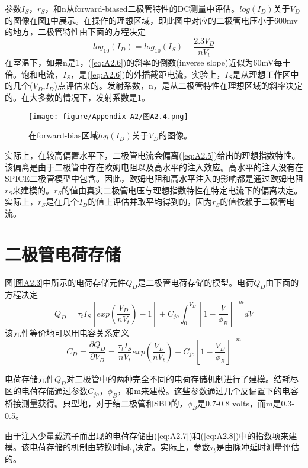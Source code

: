 参数$I_S$，$r_S$，和n从forward-biased二极管特性的DC测量中评估。$log(I_D)$关于$V_D$的图像在图\ref{图A2.4}中展示。在操作的理想区域，即此图中对应的二极管电压小于600mv的地方，二极管特性由下面的方程决定
\begin{equation}
    log_{10}(I_D) = log_{10}(I_S) + \frac{2.3V_D}{nV_t}
    \label{eq:A2.6}
\end{equation}
在室温下，如果n是1，(\ref{eq:A2.6})的斜率的倒数(inverse slope)近似为60mV每十倍。饱和电流，$I_S$，是(\ref{eq:A2.6})的外插截距电流。实验上，$I_S$是从理想工作区中的几个($V_D$,$I_D$)点评估来的。发射系数，n，是从二极管特性在理想区域的斜率决定的。在大多数的情况下，发射系数是1。

\begin{figure}[htbp]
\small
    \centering
    \texttt{[image: figure/Appendix-A2/图A2.4.png]}
    \caption{在forward-bias区域$log(I_D)$关于$V_D$的图像。}
    \label{图A2.4}
\end{figure}

实际上，在较高偏置水平下，二极管电流会偏离(\ref{eq:A2.5})给出的理想指数特性。该偏离是由于二极管中存在欧姆电阻以及高水平的注入效应\cite{ref-77}。高水平的注入没有在SPICE二极管模型中包含。因此，欧姆电阻和高水平注入的影响都是通过欧姆电阻$r_S$来建模的。$r_S$的值由真实二极管电压与理想指数特性在特定电流下的偏离决定。实际上，$r_S$是在几个$I_D$的值上评估并取平均得到的，因为$r_S$的值依赖于二极管电流。

\section{二极管电荷存储}
图\ref{图A2.3}中所示的电荷存储元件$Q_D$是二极管电荷存储的模型。电荷$Q_D$由下面的方程决定
\begin{equation}
    Q_D = \tau_t I_S[exp(\frac{V_D}{nV_t})-1] + C_{jo}\int^{V_D}_{0}[1-\frac{V}{\phi_B}]^{-m}dV
    \label{eq:A2.7}
\end{equation}
该元件等价地可以用电容关系定义
\begin{equation}
    C_D = \frac{\partial Q_D}{\partial V_D} = \frac{\tau_t I_S}{nV_t}exp(\frac{V_D}{nV_t}) + C_{jo}[1-\frac{V_D}{\phi_B}]^{-m}
    \label{eq:A2.8}
\end{equation}

电荷存储元件$Q_D$对二极管中的两种完全不同的电荷存储机制进行了建模。结耗尽区的电荷存储通过参数$C_{jo}$，$\phi_B$，和m来建模。这些参数通过几个反偏置下的电容桥接测量获得。典型地，对于结二极管和SBD的，$\phi_B$是0.7-0.8 volts，而m是0.3-0.5。 

由于注入少量载流子而出现的电荷存储由(\ref{eq:A2.7})和(\ref{eq:A2.8})中的指数项来建模。该电荷存储的机制由转换时间$\tau_t$决定。实际上，参数$\tau_t$是由脉冲延时测量评估的。

